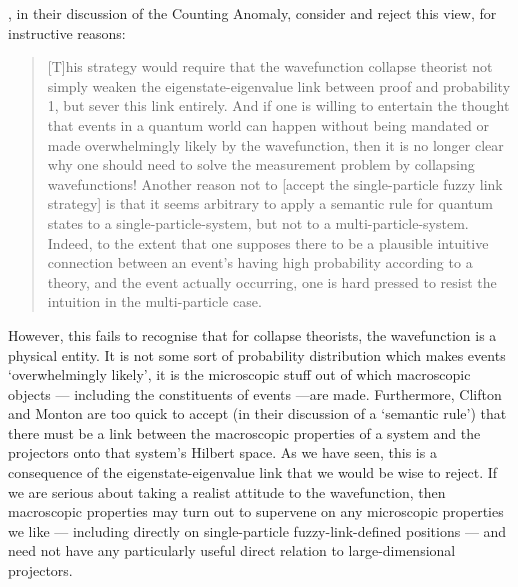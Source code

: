 \documentclass[12pt]{article}
\begin{document}
, in their discussion of the Counting Anomaly, consider and reject this view, for instructive reasons:
\begin{quote}
[T]his strategy would require that the wavefunction collapse theorist not simply weaken the eigenstate-eigenvalue link between proof and probability 1, but sever this link entirely. And if one is willing to entertain the thought that events in a quantum world can happen without being mandated or made overwhelmingly likely by the wavefunction, then it is no longer clear why one should need to solve the measurement problem by collapsing wavefunctions! Another reason not to [accept the single-particle fuzzy link strategy] is that it seems arbitrary to apply a semantic rule for quantum states to a single-particle-system, but not to a multi-particle-system. Indeed, to the extent that one supposes there to be a plausible intuitive connection between an event's having high probability according to a theory, and the event actually occurring, one is hard pressed to resist the intuition in the multi-particle case.
\end{quote}
However, this fails to recognise that for collapse theorists, the wavefunction is a physical entity. It is not some sort of probability distribution which makes events `overwhelmingly likely', it is the microscopic stuff out of which macroscopic objects  --- including the constituents of events ---are made. Furthermore, Clifton and Monton are too quick to accept (in their discussion of a `semantic rule') that there must be a link between the macroscopic properties of a system and the projectors onto that system's Hilbert space. As we have seen, this is a consequence of the eigenstate-eigenvalue link that we would be wise to reject. If we are serious about taking a realist attitude to the wavefunction, then macroscopic properties may turn out to supervene on any microscopic properties we like --- including directly on single-particle fuzzy-link-defined positions --- and need  not have any particularly useful direct relation to large-dimensional projectors.
\end{document}

